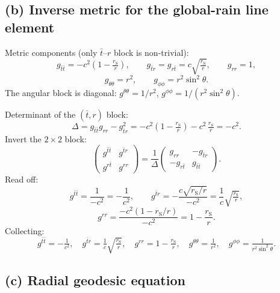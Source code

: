 \documentclass[11pt]{article}
\newcommand{\rs}{r_{\mathrm{S}}}
\begin{document}
\subsection*{(b) Inverse metric for the global-rain line element}

Metric components (only $\bar t$--$r$ block is non-trivial):
\[
g_{\bar t\bar t} = -c^2\!\left(1-\tfrac{\rs}{r}\right),\qquad g_{\bar t r}=g_{r\bar t}=c\sqrt{\tfrac{\rs}{r}},\qquad g_{rr}=1,
\]
\[
g_{\theta\theta}=r^2,\qquad g_{\phi\phi}=r^2\sin^2\theta.
\]
The angular block is diagonal: $g^{\theta\theta}=1/r^2$, $g^{\phi\phi}=1/(r^2\sin^2\theta)$.

Determinant of the $(\bar t,r)$ block:
\[
\Delta = g_{\bar t\bar t}g_{rr} - g_{\bar t r}^2 = -c^2\!\left(1-\tfrac{\rs}{r}\right) - c^2\,\tfrac{\rs}{r} = -c^2.
\]
Invert the $2\times 2$ block:
\[
\begin{pmatrix} g^{\bar t\bar t} & g^{\bar t r}\\ g^{r\bar t} & g^{rr}\end{pmatrix}
= \frac{1}{\Delta}\begin{pmatrix} g_{rr} & -g_{\bar t r}\\ -g_{r\bar t} & g_{\bar t\bar t}\end{pmatrix}.
\]
Read off:
\[
g^{\bar t\bar t} = \frac{1}{-c^2} = -\frac{1}{c^2},\qquad g^{\bar t r} = -\frac{c\sqrt{\rs/r}}{-c^2} = \frac{1}{c}\sqrt{\tfrac{\rs}{r}},
\]
\[
g^{rr} = \frac{-c^2(1-\rs/r)}{-c^2} = 1-\frac{\rs}{r}.
\]
Collecting:
\begin{equation}
\boxed{\;g^{\bar t\bar t}=-\tfrac{1}{c^2},\quad g^{\bar t r}=\tfrac{1}{c}\sqrt{\tfrac{\rs}{r}},\quad g^{rr}=1-\tfrac{\rs}{r},\quad g^{\theta\theta}=\tfrac{1}{r^2},\quad g^{\phi\phi}=\tfrac{1}{r^2\sin^2\theta}.\;}
\label{eq:invmetric}
\end{equation}

\subsection*{(c) Radial geodesic equation}
\end{document}
